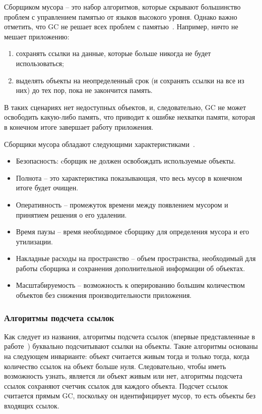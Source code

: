 Сборщиком мусора -- это набор алгоритмов, которые скрывают большинство проблем с управлением памятью от языков высокого уровня.
Однако важно отметить, что GC не решает всех проблем с памятью~\cite{appel1989simple}.
Например, ничто не мешает приложению:
\begin{enumerate}
    \item сохранять ссылки на данные, которые больше никогда не будет использоваться;
    \item выделять объекты на неопределенный срок (и сохранять ссылки на все из них) до тех пор, пока не закончится память.
\end{enumerate}

В таких сценариях нет недоступных объектов, и, следовательно, GC не может освободить какую-либо память, что приводит к ошибке нехватки памяти, которая в конечном итоге завершает работу приложения.


Сборщики мусора обладают следующими характеристиками~\cite{gidra2013study}.
\begin{itemize}
    \item Безопасность: cборщик не должен освобождать используемые объекты.
    \item Полнота -- это характеристика показывающая, что весь мусор в конечном итоге будет очищен.
    \item Оперативность -- промежуток времени между появлением мусором и принятием решения о его удалении.
    \item Время паузы -- время необходимое сборщику для определения мусора и его утилизации.
    \item Накладные расходы на пространство -- объем пространства, необходимый для работы сборщика и сохранения дополнительной информации об объектах.
    \item Масштабируемость -- возможность к оперированию большим количеством объектов без снижения производительности приложения.
\end{itemize}


\subsubsection*{Алгоритмы подсчета ссылок}

Как следует из названия, алгоритмы подсчета ссылок (впервые представленные в работе~\cite{collins1960method}) буквально подсчитывают ссылки на объекты.
Такие алгоритмы основаны на следующем инварианте: объект считается живым тогда и только тогда, когда количество ссылок на объект больше нуля.
Следовательно, чтобы иметь возможность узнать, является ли объект живым или нет, алгоритмы подсчета ссылок сохраняют счетчик ссылок для каждого объекта.
Подсчет ссылок считается прямым GC, поскольку он идентифицирует мусор, то есть объекты без входящих ссылок.

